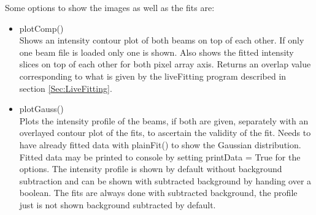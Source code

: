 \documentclass[twoside,openright]{scrreprt}
\begin{document}
Some options to show the images as well as the fits are:
\begin{itemize}
\item plotComp()\\
Shows an intensity contour plot of both beams on top of each other. If only one beam file is loaded only one is shown. Also shows the fitted intensity slices on top of each other for both pixel array axis. Returns an overlap value corresponding to what is given by the liveFitting program described in section \ref{Sec:LiveFitting}.
\item plotGauss()\\
Plots the intensity profile of the beams, if both are given, separately with an overlayed contour plot of the fits, to ascertain the validity of the fit. Needs to have already fitted data with plainFit() to show the Gaussian distribution. Fitted data may be printed to console by setting printData = True for the options. The intensity profile is shown by default without background subtraction and can be shown with subtracted background by handing over a boolean. The fits are always done with subtracted background, the profile just is not shown background subtracted by default.
\end{itemize}
\end{document}
